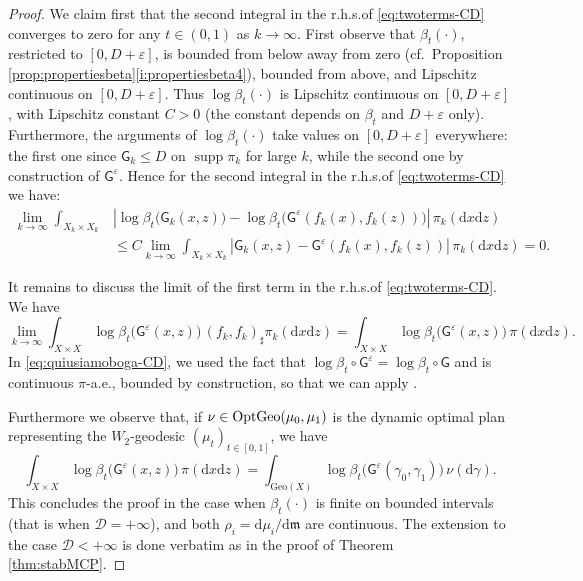 \documentclass[11pt,a4paper]{article}
\theoremstyle{plain}
\theoremstyle{definition}
\theoremstyle{remark}
\numberwithin{equation}{section}
\DeclareMathOperator{\supp}{\mathrm{supp}}
\newcommand{\ve}{\varepsilon}
\newcommand{\Geo}{\mathrm{Geo}}
\newcommand{\OptGeo}{{\rm OptGeo}}
\newcommand{\cD}{\mathcal{D}}
\newcommand{\di}{\mathrm{d}}
\newcommand{\mm}{\mathfrak m}
\newcommand{\sfG}{\mathsf G}
\begin{document}
\begin{proof}
We claim first that the second integral in the r.h.s.\@ of \eqref{eq:twoterms-CD} converges to zero for any $t\in (0,1)$ as $k\to \infty$. First observe that $\beta_t(\cdot)$, restricted to $[0,D+\ve]$, is bounded from below away from zero (cf.\ Proposition \ref{prop:propertiesbeta}\ref{i:propertiesbeta4}), bounded from above, and Lipschitz continuous on $[0,D+\ve]$. Thus $\log\beta_t(\cdot)$ is Lipschitz continuous on $[0,D+\ve]$, with Lipschitz constant $C>0$ (the constant depends on $\beta_t$ and $D+\ve$ only). Furthermore, the arguments of $\log\beta_t(\cdot)$ take values on $[0,D+\ve]$ everywhere: the first one since $\sfG_k\leq D$ on  $\supp\pi_k$ for large $k$, while the second one by construction of $\sfG^{\ve}$. Hence for the second integral in the r.h.s.\@ of \eqref{eq:twoterms-CD} we have:
\begin{align}\label{eq:lipschitzproperty-CD}
\lim_{k\to \infty} \int_{X_k\times X_k} &\left\lvert\log\beta_t\big(\sfG_k(x,z)\big)-\log\beta_t\big(\sfG^{\ve}(f_k(x),f_k(z))\big)\right\rvert\, \pi_{k}(\di x \di z) \nonumber  \\
 &\leq C \lim_{k\to \infty} \int_{X_k\times X_k}\left\lvert\sfG_k(x,z)-\sfG^{\ve}(f_k(x),f_k(z))\right\rvert\, \pi_{k}(\di x\di z)  =0.
\end{align}

It remains to discuss the limit of the first term in the r.h.s.\@ of \eqref{eq:twoterms-CD}. We have
\begin{equation}\label{eq:quiusiamoboga-CD}
\lim_{k\to \infty}   \int_{X\times X} \log\beta_t\big(\sfG^{\ve}(x,z)\big)\,(f_k,f_k)_\sharp\pi_{k}(\di x \di z)  = \int_{X\times X} \log\beta_t\big(\sfG^{\ve}(x,z)\big)\,\pi(\di x\di z).
\end{equation}
In \eqref{eq:quiusiamoboga-CD}, we used the fact that $\log\beta_t\circ\sfG^\ve = \log\beta_t\circ \sfG$ and is continuous $\pi$-a.e., bounded by construction, so that we can apply \cite[Cor.\ 2.2.10]{Bogachev-Weak}.

Furthermore we observe that, if $\nu \in \OptGeo(\mu_0,\mu_1)$ is the dynamic optimal plan representing the $W_2$-geodesic $(\mu_t)_{t\in [0,1]}$, we have
\begin{equation}
\int_{X\times X} \log\beta_t\big(\sfG^{\ve}(x,z)\big)\,\pi(\di x\di z) = \int_{\Geo(X)} \log\beta_t\big(\sfG^{\ve}(\gamma_0,\gamma_1)\big)\,\nu(\di\gamma).
\end{equation}
This concludes the proof in the case when $\beta_t(\cdot)$ is finite on bounded intervals (that is when $\cD=+\infty$), and both $\rho_i=\di \mu_i/\di \mm$ are continuous. The extension to the case $\cD<+\infty$ is done verbatim as in the proof of Theorem \ref{thm:stabMCP}.


\end{proof}
\end{document}
